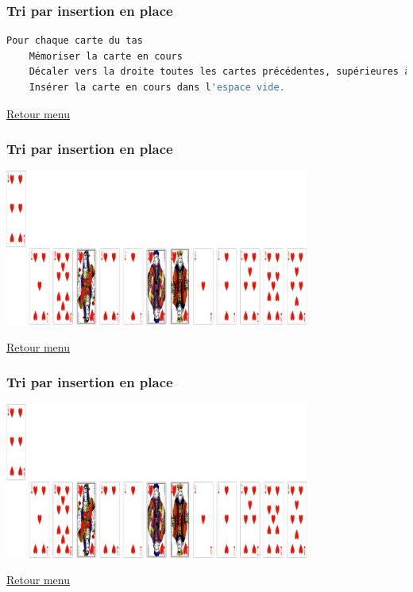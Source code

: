 \documentclass[svgnames,11pt]{beamer}
\begin{document}
\begin{frame}[fragile]
    \frametitle{\hypertarget{insertion1}{Tri par insertion en place}}

    \begin{center}
        \begin{lstlisting}[language=bash, basicstyle=\small, xrightmargin=1em]
Pour chaque carte du tas
    Mémoriser la carte en cours
    Décaler vers la droite toutes les cartes précédentes, supérieures à la carte en cours.
    Insérer la carte en cours dans l'espace vide.
        \end{lstlisting}
        \label{CODE}
    \end{center}
    \hyperlink{menu}{Retour menu}

\end{frame}

\begin{frame}
    \frametitle{Tri par insertion en place}

    \begin{center}
        \centering
        \includegraphics[width=10cm]{ressources/insertion-1.png}
        \label{pique}
    \end{center}
    \hyperlink{menu}{Retour menu}

\end{frame}

\begin{frame}
    \frametitle{Tri par insertion en place}

    \begin{center}
        \centering
        \includegraphics[width=10cm]{ressources/insertion-1.png}
        \label{pique}
    \end{center}
    \hyperlink{menu}{Retour menu}

\end{frame}
\end{document}
